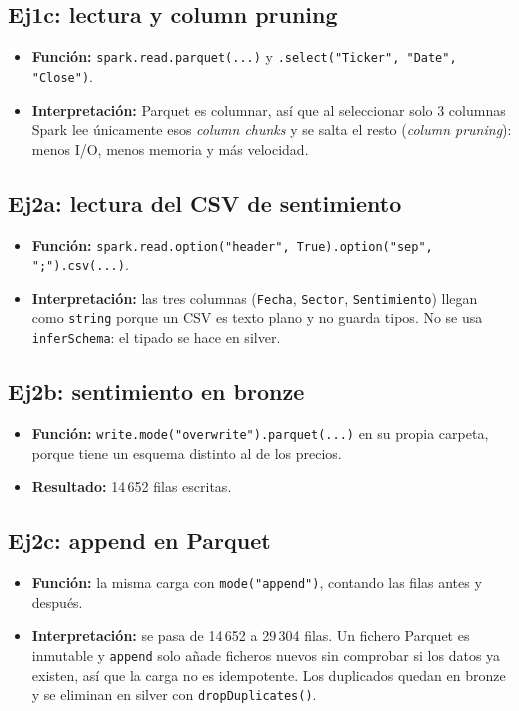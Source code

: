 \documentclass[11pt,a4paper]{article}
\newcommand{\code}[1]{\texttt{#1}}
\begin{document}
\subsection*{Ej1c: lectura y column pruning}
\begin{itemize}
    \item \textbf{Función:} \code{spark.read.parquet(...)} y \code{.select("Ticker", "Date", "Close")}.
    \item \textbf{Interpretación:} Parquet es columnar, así que al seleccionar solo 3 columnas Spark lee únicamente esos \textit{column chunks} y se salta el resto (\textit{column pruning}): menos I/O, menos memoria y más velocidad.
\end{itemize}

\subsection*{Ej2a: lectura del CSV de sentimiento}
\begin{itemize}
    \item \textbf{Función:} \code{spark.read.option("header", True).option("sep", ";").csv(...)}.
    \item \textbf{Interpretación:} las tres columnas (\code{Fecha}, \code{Sector}, \code{Sentimiento}) llegan como \code{string} porque un CSV es texto plano y no guarda tipos. No se usa \code{inferSchema}: el tipado se hace en silver.
\end{itemize}

\subsection*{Ej2b: sentimiento en bronze}
\begin{itemize}
    \item \textbf{Función:} \code{write.mode("overwrite").parquet(...)} en su propia carpeta, porque tiene un esquema distinto al de los precios.
    \item \textbf{Resultado:} 14\,652 filas escritas.
\end{itemize}

\subsection*{Ej2c: append en Parquet}
\begin{itemize}
    \item \textbf{Función:} la misma carga con \code{mode("append")}, contando las filas antes y después.
    \item \textbf{Interpretación:} se pasa de 14\,652 a 29\,304 filas. Un fichero Parquet es inmutable y \code{append} solo añade ficheros nuevos sin comprobar si los datos ya existen, así que la carga no es idempotente. Los duplicados quedan en bronze y se eliminan en silver con \code{dropDuplicates()}.
\end{itemize}
\end{document}
